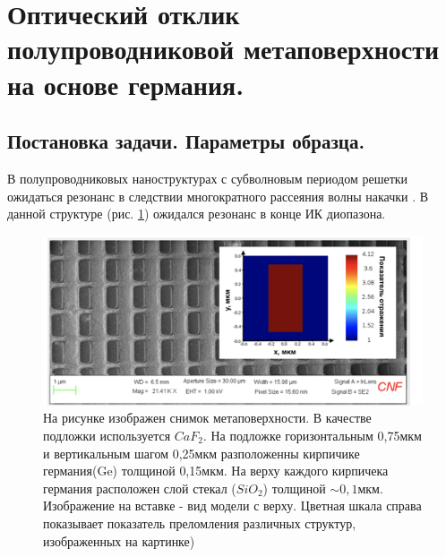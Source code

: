 \section{Оптический отклик полупроводниковой метаповерхности на основе германия.}

\subsection{Постановка задачи. Параметры образца.}
В полупроводниковых наноструктурах с субволновым периодом решетки ожидаться резонанс в следствии многократного рассеяния  волны накачки \cite{mftiOpt}. В данной структуре (рис. \ref{base1}) ожидался резонанс в конце ИК диопазона.

\begin{figure}[h]
	\centering
    \includegraphics[width=0.8\linewidth]{images/base1.png}
	\caption{На рисунке изображен снимок метаповерхности. В качестве подложки используется $CaF_2$. На подложке  горизонтальным  0,75мкм и вертикальным шагом 0,25мкм разположенны кирпичике германия(Ge) толщиной 0,15мкм. На верху каждого кирпичека германия расположен слой стекал ($SiO_2$) толщиной $\sim 0,1$мкм. Изображение на вставке - вид модели с верху. Цветная шкала справа показывает показатель преломления различных структур, изображенных на картинке)}
	\label{base1}
\end{figure}

